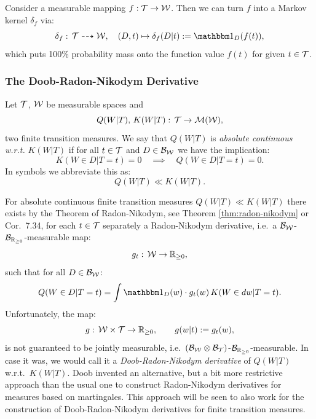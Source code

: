 \begin{Rem}
    Consider a measurable mapping $f: \mathcal{T} \to \mathcal{W}$. Then we can turn $f$ into a Markov kernel $\delta_f$ via:
    \[  \delta_f:\, \Tcal \dshto \Wcal, \quad (D,t) \mapsto \delta_f(D|t):= \I_D(f(t)),\]
    which puts 100\% probability mass onto the function value $f(t)$ for given $t \in \mathcal{T}$.
\end{Rem}


\subsubsection{The Doob-Radon-Nikodym Derivative}


\begin{Def}
    Let $\mathcal{T}$, $\mathcal{W}$ be  measurable spaces and
    \[ Q(W|T),\,K(W|T):\, \mathcal{T} \to \mathcal{M}(\mathcal{W}),  \]
    two finite transition measures. 
    We say that $Q(W|T)$ is \emph{absolute continuous w.r.t.} $K(W|T)$ if for all $t \in \mathcal{T}$ and $D \in \mathcal{B}_{\mathcal{W}}$ 
    we have the implication:
    \[ K(W \in D|T=t) =0 \quad \implies \quad Q(W \in D|T=t) =0.  \]
    In symbols we abbreviate this as:
    \[  Q(W|T) \ll K(W|T).\]
\end{Def}

\begin{Rem}
    For absolute continuous finite transition measures $Q(W|T) \ll K(W|T)$ there exists by the Theorem of Radon-Nikodym, see Theorem \ref{thm:radon-nikodym} or \cite{Kle20} Cor.\ 7.34,
    for each $t \in \mathcal{T}$ separately a Radon-Nikodym derivative, i.e.\ a $\mathcal{B}_{\mathcal{W}}$-$\mathcal{B}_{\mathbb{R}_{\ge0}}$-measurable map:
    \[ g_t:\, \mathcal{W} \to \mathbb{R}_{\ge 0},\]
    such that for all $D \in \mathcal{B}_{\mathcal{W}}$:
    \[ Q(W \in D|T=t) = \int \I_D(w) \cdot g_t(w) \, K(W \in dw|T=t). \]
    Unfortunately, the map:
    \[  g:\, \mathcal{W} \times \mathcal{T} \to \mathbb{R}_{\ge0},\qquad g(w|t):=g_t(w),\]
    is not guaranteed to be jointly measurable, i.e.\ $(\mathcal{B}_{\mathcal{W}}\otimes\mathcal{B}_{\mathcal{T}})$-$\mathcal{B}_{\mathbb{R}_{\ge0}}$-measurable.
    In case it was, we would call it a \emph{Doob-Radon-Nikodym derivative} of  $Q(W|T)$ w.r.t.\ $K(W|T)$.
    Doob invented an alternative, but a bit more restrictive approach than the usual one
    to construct Radon-Nikodym derivatives for measures based on martingales.
    This approach will be seen to also work for the construction of Doob-Radon-Nikodym derivatives for finite transition measures.
\end{Rem}


